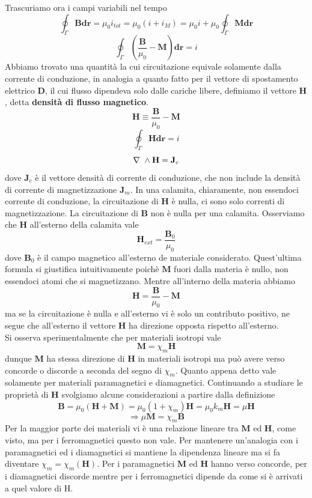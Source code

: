 \documentclass[
10pt, %
a4paper, %
oneside, %
headinclude,footinclude, %
BCOR5mm, %
]{scrartcl}
\begin{document}
Trascuriamo ora i campi variabili nel tempo
\[\oint_\Gamma \mathbf{B}\mathbf{dr} = \mu_0 i_{tot} = \mu_0(i + i_M)=\mu_0 i +\mu_0\oint_\Gamma \mathbf{M}\mathbf{dr}\]
\[\oint_\Gamma\left(\frac{\mathbf{B}}{\mu_0}-\mathbf{M}\right)\mathbf{dr} = i\]
Abbiamo trovato una quantità la cui circuitazione equivale solamente dalla corrente di conduzione, in analogia a quanto fatto per il vettore di spostamento elettrico \(\mathbf{D}\), il cui flusso dipendeva solo dalle cariche libere, definiamo il vettore \(\mathbf{H}\), detta \textbf{densità di flusso magnetico}. 
\[\mathbf{H}\equiv \frac{\mathbf{B}}{\mu_0}- \mathbf{M}\]
\[\oint_\Gamma\mathbf{H}\mathbf{dr} = i\]
\[\nabla\ \wedge\mathbf{H}=\mathbf{J}_c\]
dove \(\mathbf{J}_c\) è il vettore densità di corrente di conduzione, che non include la densità di corrente di magnetizzazione \(\mathbf{J}_m\).
In una calamita, chiaramente, non essendoci corrente di conduzione, la circuitazione di \(\mathbf{H}\) è nulla, ci sono solo correnti di magnetizzazione. La circuitazione di \(\mathbf{B}\) non è nulla per una calamita. Osserviamo che \(\mathbf{H}\) all'esterno della calamita vale
\[\mathbf{H}_{ext} = \frac{\mathbf{B}_0}{\mu_0}\]
dove \(\mathbf{B}_0\) è il campo magnetico all'esterno de materiale considerato. Quest'ultima formula si giustifica intuitivamente poichè \(\mathbf{M}\) fuori dalla materia è nullo, non essendoci atomi che si magnetizzano. Mentre all'interno della materia abbiamo
\[\mathbf{ H }= \frac{\mathbf{B}}{\mu_0}- \mathbf{M}\] 
ma se la circuitazione è nulla e all'esterno vi è solo un contributo positivo, ne segue che all'esterno il vettore \(\mathbf{H}\) ha direzione opposta rispetto all'esterno.\\
Si osserva sperimentalmente che per materiali isotropi vale
\[\mathbf{M} = \chi_m\mathbf{H}\]
dunque \(\mathbf{M}\) ha stessa direzione di \(\mathbf{H}\) in materiali isotropi ma può avere verso concorde o discorde a seconda del segno di \(\chi_m\). Quanto appena detto vale solamente per materiali paramagnetici e diamagnetici. Continuando a studiare le proprietà di \(\mathbf{H}\) svolgiamo alcune considerazioni a partire dalla definizione
\[\mathbf{B} = \mu_0 (\mathbf{H}+\mathbf{M}) = \mu_0 (1 +\chi_m)\mathbf{H} = \mu_0 k_m\mathbf{H}=\mu \mathbf{H}\]
\[\Rightarrow \mu\mathbf{M} = \chi_m \mathbf{B}\]
Per la maggior parte dei materiali vi è una relazione lineare tra \(\mathbf{M}\) ed \(\mathbf{H}\), come visto, ma per i ferromagnetici questo non vale. Per mantenere un'analogia con i paramagnetici ed i diamagnetici si mantiene la dipendenza lineare ma si fa diventare \(\chi_m = \chi_m(\mathbf{H})\). Per i paramagnetici \(\mathbf{M}\) ed \(\mathbf{H}\) hanno verso concorde, per i diamagnetici discorde mentre per i ferromagnetici dipende da come si è arrivati a quel valore di H.
\end{document}
